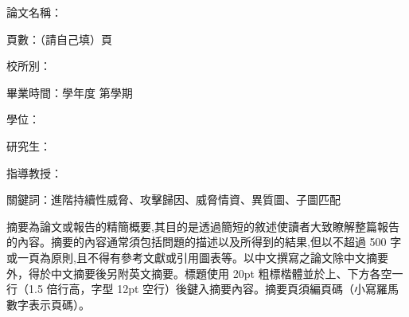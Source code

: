 \begin{ZhAbstract}
    \begin{ZhAbstractItems}
        \noindent \text 論文名稱：\cTitle

        \noindent \text 頁數：（請自己填）頁

        \noindent \text 校所別：\univCname \space \deptCname

        \noindent \text 畢業時間：\cAcademicYear 學年度 \space 第\cGraduateSemester 學期

        \noindent \text 學位：\degreeCname

        \noindent \text 研究生：\myCname

        \noindent \text 指導教授：\advisorCname

        \noindent \text 關鍵詞：進階持續性威脅、攻擊歸因、威脅情資、異質圖、子圖匹配

    \end{ZhAbstractItems}

    \begin{ZhAbstractDescription}
        摘要為論文或報告的精簡概要,其目的是透過簡短的敘述使讀者大致瞭解整篇報告的內容。摘要的內容通常須包括問題的描述以及所得到的結果,但以不超過 500 字或一頁為原則,且不得有參考文獻或引用圖表等。以中文撰寫之論文除中文摘要外，得於中文摘要後另附英文摘要。標題使用 20pt 粗標楷體並於上、下方各空一行（1.5 倍行高，字型 12pt 空行）後鍵入摘要內容。摘要頁須編頁碼（小寫羅馬數字表示頁碼）。
    \end{ZhAbstractDescription}
    
\end{ZhAbstract}

